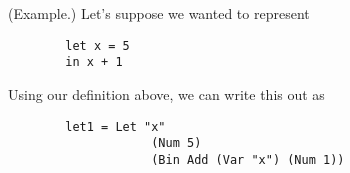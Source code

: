\documentclass[letterpaper]{article}
\begin{document}
\begin{mdframed}[nobreak=true]
    (Example.) Let's suppose we wanted to represent
    \begin{verbatim}
        let x = 5
        in x + 1\end{verbatim}
    Using our definition above, we can write this out as 
    \begin{verbatim}
        let1 = Let "x" 
                    (Num 5)
                    (Bin Add (Var "x") (Num 1))\end{verbatim}
\end{mdframed}
\end{document}
